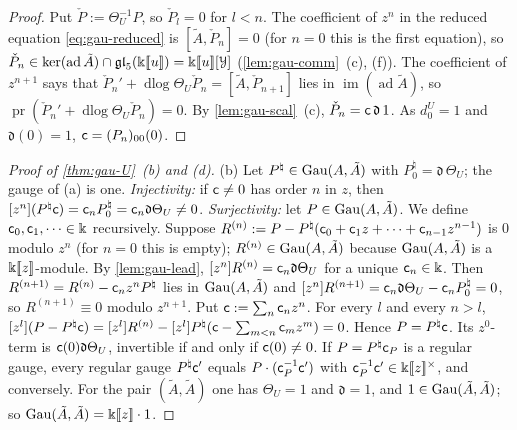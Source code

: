 \begin{proof}
Put $\check P:=\Theta_U^{-1}P$, so $\check P_l=0$ for $l<n$. The coefficient of $z^n$ in the reduced equation \eqref{eq:gau-reduced} is $[\tilde A,\check P_n]=0$ (for $n=0$ this is the first equation), so $\check P_n\in\ker(\operatorname{ad}\tilde A)\cap\mathfrak{gl}_5(\Bbbk[\![ u ]\!])=\Bbbk[\![ u ]\!][\mathcal Y]$ (\cref{lem:gau-comm}~(c), (f)). The coefficient of $z^{n+1}$ says that $\check P_n'+\operatorname{dlog}\Theta_U\check P_n=[\tilde A,\check P_{n+1}]$ lies in $\operatorname{im}(\operatorname{ad}\tilde A)$, so $\operatorname{pr}(\check P_n'+\operatorname{dlog}\Theta_U\check P_n)=0$. By \cref{lem:gau-scal}~(c), $\check P_n=\mathsf{c}\,\mathfrak d\,1$. As $d^U_0=1$ and $\mathfrak d(0)=1$, $\mathsf{c}=(P_n)_{00}(0)$.
\end{proof}

\begin{proof}[Proof of \cref{thm:gau-U}~(b) and (d)]
(b) Let $P^\natural\in\operatorname{Gau}(A,\tilde A)$ with $P^\natural_0=\mathfrak d\,\Theta_U$; the gauge of (a) is one. \emph{Injectivity:} if $\mathsf{c}\neq0$ has order $n$ in $z$, then $[z^n](P^\natural\mathsf{c})=\mathsf{c}_nP^\natural_0=\mathsf{c}_n\mathfrak d\Theta_U\neq0$. \emph{Surjectivity:} let $P\in\operatorname{Gau}(A,\tilde A)$. We define $\mathsf{c}_0,\mathsf{c}_1,\dots\in\Bbbk$ recursively. Suppose $R^{(n)}:=P-P^\natural(\mathsf{c}_0+\mathsf{c}_1z+\dots+\mathsf{c}_{n-1}z^{n-1})$ is $0$ modulo $z^n$ (for $n=0$ this is empty); $R^{(n)}\in\operatorname{Gau}(A,\tilde A)$ because $\operatorname{Gau}(A,\tilde A)$ is a $\Bbbk[\![ z ]\!]$-module. By \cref{lem:gau-lead}, $[z^n]R^{(n)}=\mathsf{c}_n\mathfrak d\Theta_U$ for a unique $\mathsf{c}_n\in\Bbbk$. Then $R^{(n+1)}=R^{(n)}-\mathsf{c}_nz^nP^\natural$ lies in $\operatorname{Gau}(A,\tilde A)$ and $[z^n]R^{(n+1)}=\mathsf{c}_n\mathfrak d\Theta_U-\mathsf{c}_nP^\natural_0=0$, so $R^{(n+1)}\equiv0$ modulo $z^{n+1}$. Put $\mathsf{c}:=\sum_n\mathsf{c}_nz^n$. For every $l$ and every $n>l$, $[z^l](P-P^\natural\mathsf{c})=[z^l]R^{(n)}-[z^l]P^\natural(\mathsf{c}-\sum_{m<n}\mathsf{c}_mz^m)=0$. Hence $P=P^\natural\mathsf{c}$. Its $z^0$-term is $\mathsf{c}(0)\mathfrak d\Theta_U$, invertible if and only if $\mathsf{c}(0)\neq0$. If $P=P^\natural\mathsf{c}_P$ is a regular gauge, every regular gauge $P^\natural\mathsf{c}'$ equals $P\cdot(\mathsf{c}_P^{-1}\mathsf{c}')$ with $\mathsf{c}_P^{-1}\mathsf{c}'\in\Bbbk[\![ z ]\!]^\times$, and conversely. For the pair $(\tilde A,\tilde A)$ one has $\Theta_U=1$ and $\mathfrak d=1$, and $1\in\operatorname{Gau}(\tilde A,\tilde A)$; so $\operatorname{Gau}(\tilde A,\tilde A)=\Bbbk[\![ z ]\!]\cdot1$.


\end{proof}
